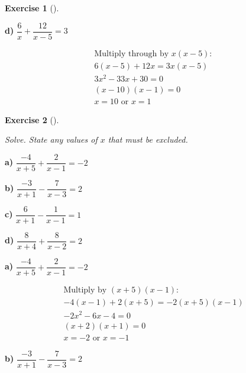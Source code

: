 \documentclass[
  letterpaper,
  DIV=11,
  numbers=noendperiod]{scrreprt}
\theoremstyle{definition}
\newtheorem{exercise}{Exercise}[chapter]
\theoremstyle{remark}
\begin{document}
\begin{exercise}[]
\begin{tcolorbox}
\textbf{d)} \(\displaystyle \dfrac{6}{x} + \dfrac{12}{x - 5} = 3\)

\begin{align*}
\text{Multiply through by } x(x - 5): \\ 6(x - 5) + 12x = 3x(x - 5) \\ 3x^2 - 33x + 30 = 0 \\ (x - 10)(x - 1) = 0 \\ x = 10 \text{ or } x = 1
\end{align*}

\end{tcolorbox}

\end{exercise}

\begin{exercise}[]\protect\hypertarget{exr-u6-34}{}\label{exr-u6-34}

\emph{Solve. State any values of \(x\) that must be excluded.}

\textbf{a)} \(\displaystyle \dfrac{-4}{x + 5} + \dfrac{2}{x - 1} = -2\)

\textbf{b)} \(\displaystyle \dfrac{-3}{x + 1} - \dfrac{7}{x - 3} = 2\)

\textbf{c)} \(\displaystyle \dfrac{6}{x + 1} - \dfrac{1}{x - 1} = 1\)

\textbf{d)} \(\displaystyle \dfrac{8}{x + 4} + \dfrac{8}{x - 2} = 2\)

\begin{tcolorbox}[enhanced jigsaw, opacitybacktitle=0.6, coltitle=black, arc=.35mm, colframe=quarto-callout-tip-color-frame, colback=white, bottomrule=.15mm, left=2mm, colbacktitle=quarto-callout-tip-color!10!white, titlerule=0mm, opacityback=0, title=\textcolor{quarto-callout-tip-color}{\faLightbulb}\hspace{0.5em}{🔍 View Solutions}, leftrule=.75mm, breakable, rightrule=.15mm, bottomtitle=1mm, toptitle=1mm, toprule=.15mm]

\textbf{a)} \(\displaystyle \dfrac{-4}{x + 5} + \dfrac{2}{x - 1} = -2\)

\begin{align*}
\text{Multiply by } (x + 5)(x - 1): \\ -4(x - 1) + 2(x + 5) = -2(x + 5)(x - 1) \\ -2x^2 - 6x - 4 = 0 \\ (x + 2)(x + 1) = 0 \\ x = -2 \text{ or } x = -1
\end{align*}

\textbf{b)} \(\displaystyle \dfrac{-3}{x + 1} - \dfrac{7}{x - 3} = 2\)


\end{tcolorbox}
\end{exercise}
\end{document}
